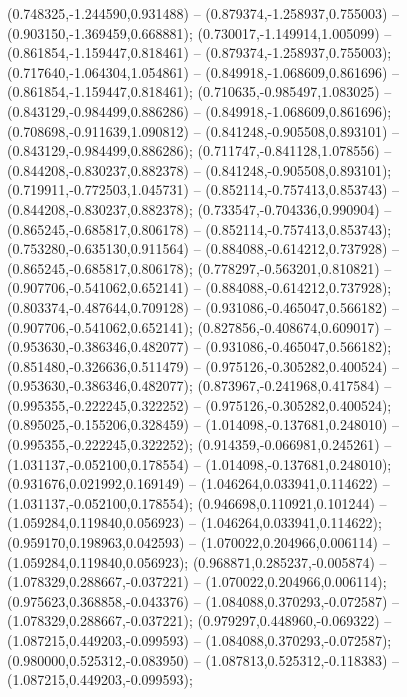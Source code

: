 (0.748325,-1.244590,0.931488) -- (0.879374,-1.258937,0.755003) -- (0.903150,-1.369459,0.668881);
 (0.730017,-1.149914,1.005099) -- (0.861854,-1.159447,0.818461) -- (0.879374,-1.258937,0.755003);
 (0.717640,-1.064304,1.054861) -- (0.849918,-1.068609,0.861696) -- (0.861854,-1.159447,0.818461);
 (0.710635,-0.985497,1.083025) -- (0.843129,-0.984499,0.886286) -- (0.849918,-1.068609,0.861696);
 (0.708698,-0.911639,1.090812) -- (0.841248,-0.905508,0.893101) -- (0.843129,-0.984499,0.886286);
 (0.711747,-0.841128,1.078556) -- (0.844208,-0.830237,0.882378) -- (0.841248,-0.905508,0.893101);
 (0.719911,-0.772503,1.045731) -- (0.852114,-0.757413,0.853743) -- (0.844208,-0.830237,0.882378);
 (0.733547,-0.704336,0.990904) -- (0.865245,-0.685817,0.806178) -- (0.852114,-0.757413,0.853743);
 (0.753280,-0.635130,0.911564) -- (0.884088,-0.614212,0.737928) -- (0.865245,-0.685817,0.806178);
 (0.778297,-0.563201,0.810821) -- (0.907706,-0.541062,0.652141) -- (0.884088,-0.614212,0.737928);
 (0.803374,-0.487644,0.709128) -- (0.931086,-0.465047,0.566182) -- (0.907706,-0.541062,0.652141);
 (0.827856,-0.408674,0.609017) -- (0.953630,-0.386346,0.482077) -- (0.931086,-0.465047,0.566182);
 (0.851480,-0.326636,0.511479) -- (0.975126,-0.305282,0.400524) -- (0.953630,-0.386346,0.482077);
 (0.873967,-0.241968,0.417584) -- (0.995355,-0.222245,0.322252) -- (0.975126,-0.305282,0.400524);
 (0.895025,-0.155206,0.328459) -- (1.014098,-0.137681,0.248010) -- (0.995355,-0.222245,0.322252);
 (0.914359,-0.066981,0.245261) -- (1.031137,-0.052100,0.178554) -- (1.014098,-0.137681,0.248010);
 (0.931676,0.021992,0.169149) -- (1.046264,0.033941,0.114622) -- (1.031137,-0.052100,0.178554);
 (0.946698,0.110921,0.101244) -- (1.059284,0.119840,0.056923) -- (1.046264,0.033941,0.114622);
 (0.959170,0.198963,0.042593) -- (1.070022,0.204966,0.006114) -- (1.059284,0.119840,0.056923);
 (0.968871,0.285237,-0.005874) -- (1.078329,0.288667,-0.037221) -- (1.070022,0.204966,0.006114);
 (0.975623,0.368858,-0.043376) -- (1.084088,0.370293,-0.072587) -- (1.078329,0.288667,-0.037221);
 (0.979297,0.448960,-0.069322) -- (1.087215,0.449203,-0.099593) -- (1.084088,0.370293,-0.072587);
 (0.980000,0.525312,-0.083950) -- (1.087813,0.525312,-0.118383) -- (1.087215,0.449203,-0.099593);
